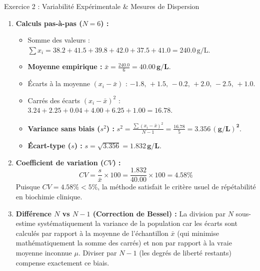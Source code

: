 \documentclass[11pt,a4paper]{article}
\begin{document}
\begin{solutionbox}{Exercice 2 : Variabilité Expérimentale \& Mesures de Dispersion}
\begin{enumerate}[label=\textbf{\alph*.}]
  \item \textbf{Calculs pas-à-pas ($N = 6$) :}
  \begin{itemize}
    \item Somme des valeurs : $\sum x_i = 38.2 + 41.5 + 39.8 + 42.0 + 37.5 + 41.0 = 240.0\,\text{g/L}$.
    \item \textbf{Moyenne empirique :} $\bar{x} = \frac{240.0}{6} = \mathbf{40.00\,\text{g/L}}$.
    \item Écarts à la moyenne $(x_i - \bar{x})$ : $-1.8, \, +1.5, \, -0.2, \, +2.0, \, -2.5, \, +1.0$.
    \item Carrés des écarts $(x_i - \bar{x})^2$ : $3.24 + 2.25 + 0.04 + 4.00 + 6.25 + 1.00 = 16.78$.
    \item \textbf{Variance sans biais ($s^2$) :} $s^2 = \frac{\sum (x_i - \bar{x})^2}{N - 1} = \frac{16.78}{5} = \mathbf{3.356\,(\text{g/L})^2}$.
    \item \textbf{Écart-type ($s$) :} $s = \sqrt{3.356} = \mathbf{1.832\,\text{g/L}}$.
  \end{itemize}

  \item \textbf{Coefficient de variation ($CV$) :}
  \begin{equation*}
    CV = \frac{s}{\bar{x}} \times 100 = \frac{1.832}{40.00} \times 100 = \mathbf{4.58\%}
  \end{equation*}
  Puisque $CV = 4.58\% < 5\%$, la méthode satisfait le critère usuel de répétabilité en biochimie clinique.

  \item \textbf{Différence $N$ vs $N-1$ (Correction de Bessel) :}
  La division par $N$ sous-estime systématiquement la variance de la population car les écarts sont calculés par rapport à la moyenne de l'échantillon $\bar{x}$ (qui minimise mathématiquement la somme des carrés) et non par rapport à la vraie moyenne inconnue $\mu$. Diviser par $N-1$ (les degrés de liberté restants) compense exactement ce biais.
\end{enumerate}
\end{solutionbox}
\end{document}

